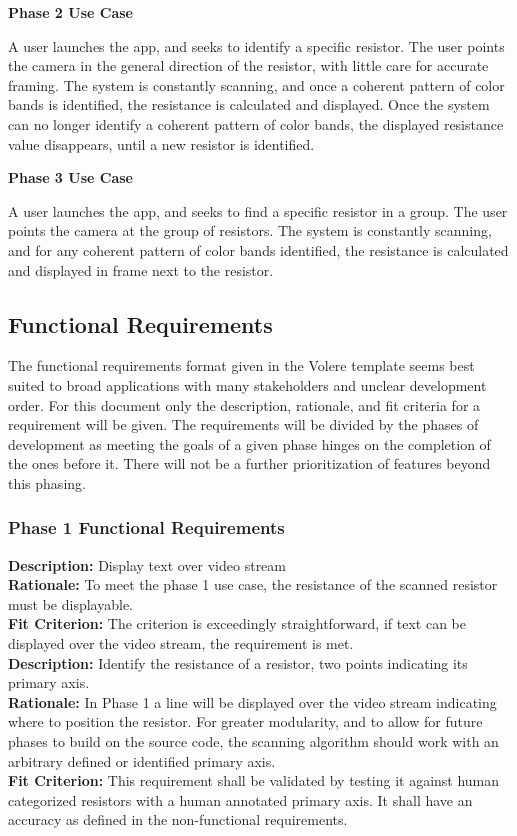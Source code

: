 \documentclass{article}
\begin{document}
\textbf{ Phase 2 Use Case}

A user launches the app, and seeks to identify a specific resistor.
The user points the camera in the general direction of the resistor, with little care for accurate framing.
The system is constantly scanning, and once a coherent pattern of color bands is identified, the resistance is calculated and displayed.
Once the system can no longer identify a coherent pattern of color bands, the displayed resistance value disappears, until a new resistor is identified.

\textbf{ Phase 3 Use Case}

A user launches the app, and seeks to find a specific resistor in a group.
The user points the camera at the group of resistors.
The system is constantly scanning, and for any coherent pattern of color bands identified, the resistance is calculated and displayed in frame next to the resistor.

\subsection{Functional Requirements}

The functional requirements format given in the Volere template seems best suited to broad applications with many stakeholders and unclear development order.
For this document only the description, rationale, and fit criteria for a requirement will be given.
The requirements will be divided by the phases of development as meeting the goals of a given phase hinges on the completion of the ones before it.
There will not be a further prioritization of features beyond this phasing.

\subsubsection{ Phase 1 Functional Requirements}

\textbf{Description:} Display text over video stream
\\ \textbf{Rationale:} To meet the phase 1 use case, the resistance of the scanned resistor must be displayable.
\\ \textbf{Fit Criterion:} The criterion is exceedingly straightforward, if text can be displayed over the video stream, the requirement is met.
\\ 

\noindent
\textbf{Description: } Identify the resistance of a resistor, two points indicating its primary axis.
\\ \textbf{Rationale: } In Phase 1 a line will be displayed over the video stream indicating where to position the resistor.
For greater modularity, and to allow for future phases to build on the source code, the scanning algorithm should work with an arbitrary defined or identified primary axis.
\\ \textbf{Fit Criterion:} This requirement shall be validated by testing it against human categorized resistors with a human annotated primary axis.
It shall have an accuracy as defined in the non-functional requirements. 
\\
\end{document}
